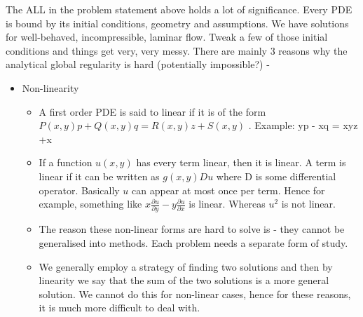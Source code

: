 \documentclass[12pt]{article}
\begin{document}
The ALL in the problem statement above holds a lot of significance. Every PDE is bound by its initial conditions, geometry and assumptions. We have solutions for well-behaved, incompressible, laminar flow. Tweak a few of those initial conditions and things get very, very messy. There are mainly 3 reasons why the analytical global regularity is hard (potentially impossible?) - 
\begin{itemize}
\item Non-linearity
\begin{itemize}
    \item A first order PDE \cite{bib6} is said to linear if it is of the form $ P(x,y) p + Q(x,y)q = R(x,y)z + S(x,y) $ . Example: yp - xq = xyz +x
    \item If a function $u(x,y)$ has every term linear, then it is linear. A term is linear if it can be written as $g(x,y)Du$ where D is some differential operator. Basically $u$ can appear at most once per term. Hence for example, something like $x\frac{\partial u}{\partial y} - y \frac{\partial u}{\partial x}$ is linear. Whereas $u^{2}$ is not linear.
    \item The reason these non-linear forms are hard to solve is - they cannot be generalised into methods. Each problem needs a separate form of study.
    \item We generally employ a strategy of finding two solutions and then by linearity we say that the sum of the two solutions is a more general solution. We cannot do this for non-linear cases, hence for these reasons, it is much more difficult to deal with.
\end{itemize}


\end{itemize}
\end{document}
